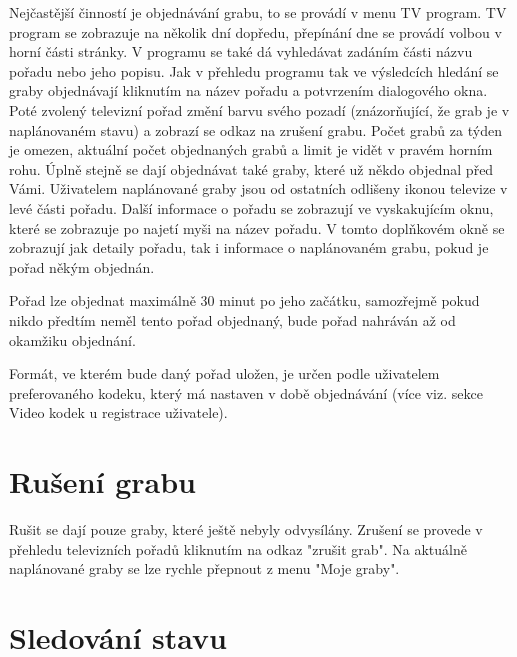 Nejčastější činností je objednávání grabu, to se provádí v menu TV program. TV program se zobrazuje na několik dní dopředu, přepínání dne se provádí volbou v horní části stránky. V programu se také dá vyhledávat zadáním části názvu pořadu nebo jeho popisu. Jak v přehledu programu tak ve výsledcích hledání se graby objednávají kliknutím na název pořadu a potvrzením dialogového okna. Poté zvolený televizní pořad změní barvu svého pozadí (znázorňující, že grab je v naplánovaném stavu) a zobrazí se odkaz na zrušení grabu. Počet grabů za týden je omezen, aktuální počet objednaných grabů a limit je vidět v pravém horním rohu. Úplně stejně se dají objednávat také graby, které už někdo objednal před Vámi. Uživatelem naplánované graby jsou od ostatních odlišeny ikonou televize v levé části pořadu. Další informace o pořadu se zobrazují ve vyskakujícím oknu, které se zobrazuje po najetí myši na název pořadu. V tomto doplňkovém okně se zobrazují jak detaily pořadu, tak i informace o naplánovaném grabu, pokud je pořad někým objednán.

\vspace{10pt}

Pořad lze objednat maximálně 30 minut po jeho začátku, samozřejmě pokud nikdo předtím neměl tento pořad objednaný, bude pořad nahráván až od okamžiku objednání.

\vspace{10pt}

Formát, ve kterém bude daný pořad uložen, je určen podle uživatelem preferovaného kodeku, který má nastaven v době objednávání (více viz. sekce Video kodek u registrace uživatele).

\vspace{10pt}

\section{Rušení grabu}

\vspace{10pt}

Rušit se dají pouze graby, které ještě nebyly odvysílány. Zrušení se provede v přehledu televizních pořadů kliknutím na odkaz "zrušit grab". Na aktuálně naplánované graby se lze rychle přepnout z menu "Moje graby".

\vspace{10pt}

\section{Sledování stavu}

